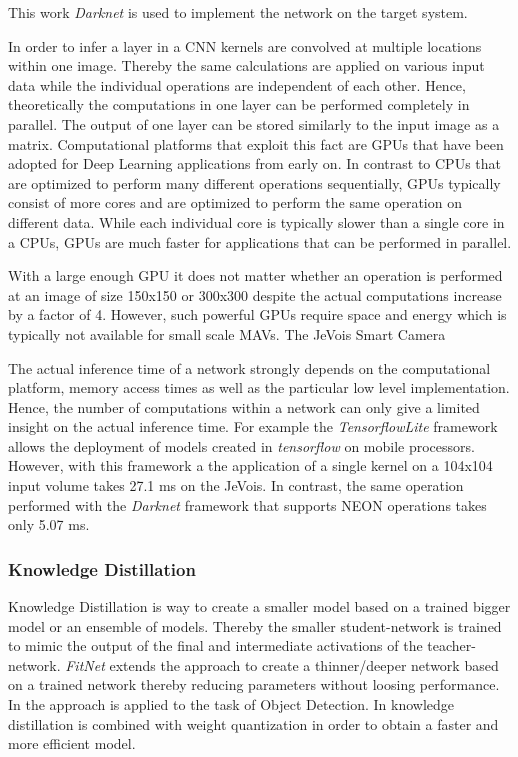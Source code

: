  This work \textit{Darknet} is used to implement the network on the target system.




In order to infer a layer in a \ac{CNN} kernels are convolved at multiple locations within one image. Thereby the same calculations are applied on various input data while the individual operations are independent of each other. Hence, theoretically the computations in one layer can be performed completely in parallel. The output of one layer can be stored similarly to the input image as a matrix. Computational platforms that exploit this fact are \acp{GPU} that have been adopted for Deep Learning applications from early on. In contrast to \acp{CPU} that are optimized to perform many different operations sequentially, \acp{GPU} typically consist of more cores and are optimized to perform the same operation on different data. While each individual core is typically slower than a single core in a \acp{CPU}, \acp{GPU} are much faster for applications that can be performed in parallel.

With a large enough \ac{GPU} it does not matter whether an operation is performed at an image of size 150x150 or 300x300 despite the actual computations increase by a factor of 4. However, such powerful \acp{GPU} require space and energy which is typically not available for small scale \acp{MAV}. The JeVois Smart Camera 

The actual inference time of a network strongly depends on the computational platform, memory access times as well as the particular low level implementation. Hence, the number of computations within a network can only give a limited insight on the actual inference time. For example the \textit{TensorflowLite} framework allows the deployment of models created in \textit{tensorflow} on mobile processors. However, with this framework a the application of a single kernel on a 104x104 input volume takes 27.1 ms on the JeVois. In contrast, the same operation performed with the \textit{Darknet} framework that supports NEON operations takes only 5.07 ms.





\subsubsection{Knowledge Distillation}

Knowledge Distillation \cite{Hinton2006} is way to create a smaller model based on a trained bigger model or an ensemble of models. Thereby the smaller student-network is trained to mimic the output of the final and intermediate activations of the teacher-network. \textit{FitNet} extends the approach to create a thinner/deeper network based on a trained network thereby reducing parameters without loosing performance. In \cite{Li2017c} the approach is applied to the task of Object Detection. In \cite{Wei2018a} knowledge distillation is combined with weight quantization in order to obtain a faster and more efficient model.




